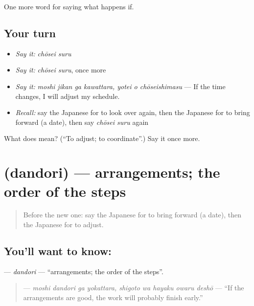 \begin{grammarlens}[title={What you've built}]
One more word for saying what happens if.
\end{grammarlens}

\subsection*{Your turn}
\begin{itemize}
\raggedright
  \item \emph{Say it:} \emph{chōsei suru}
  \item \emph{Say it:} \emph{chōsei suru}, once more
  \item \emph{Say it:} \emph{moshi jikan ga kawattara, yotei o chōseishimasu} — If the time changes, I will adjust my schedule.
  \item \emph{Recall:} say the Japanese for to look over again, then the Japanese for to bring forward (a date), then say \emph{chōsei suru} again
\end{itemize}

\begin{tcolorbox}[breakable,colback=teal!4,colframe=teal!35!black,title={Before you move on}]
What does  mean? (\textquotedblleft{}To adjust; to coordinate\textquotedblright{}.) Say it once more.
\end{tcolorbox}
\section[\texorpdfstring{\ja{だんどり} (dandori)}{だんどり (dandori)}]{ (dandori) — arrangements; the order of the steps}

\label{lesson:JA-C513-dandori}



\begin{quote}
Before the new one: say the Japanese for to bring forward (a date), then the Japanese for to adjust.
\end{quote}

\subsection*{You'll want to know: }
\textbf{} — \emph{dandori} — \textquotedblleft{}arrangements; the order of the steps\textquotedblright{}.

\begin{quote}
\textbf{    } — \emph{moshi dandori ga yokattara, shigoto wa hayaku owaru deshō} — \textquotedblleft{}If the arrangements are good, the work will probably finish early.\textquotedblright{}
\end{quote}

